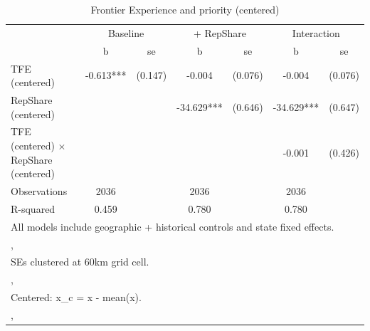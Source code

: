 \begin{table}[htbp]\centering
\def\sym#1{\ifmmode^{#1}\else\(^{#1}\)\fi}
\caption{Frontier Experience and priority (centered)}
\begin{tabular}{l*{3}{cc}}
\toprule
                &\multicolumn{2}{c}{Baseline}&\multicolumn{2}{c}{ + RepShare}&\multicolumn{2}{c}{Interaction}\\
                &        b   &       se&        b   &       se&        b   &       se\\
\midrule
TFE (centered)  &   -0.613***&  (0.147)&   -0.004   &  (0.076)&   -0.004   &  (0.076)\\
RepShare (centered)&            &         &  -34.629***&  (0.646)&  -34.629***&  (0.647)\\
TFE (centered) $\times$ RepShare (centered)&            &         &            &         &   -0.001   &  (0.426)\\
\midrule
Observations    &     2036   &         &     2036   &         &     2036   &         \\
R-squared       &    0.459   &         &    0.780   &         &    0.780   &         \\
\bottomrule
\multicolumn{7}{l}{\footnotesize All models include geographic + historical controls and state fixed effects.}\\
\multicolumn{7}{l}{\footnotesize ,}\\
\multicolumn{7}{l}{\footnotesize SEs clustered at 60km grid cell.}\\
\multicolumn{7}{l}{\footnotesize ,}\\
\multicolumn{7}{l}{\footnotesize Centered: x\_c = x - mean(x).}\\
\multicolumn{7}{l}{\footnotesize ,}\\
\end{tabular}
\end{table}

